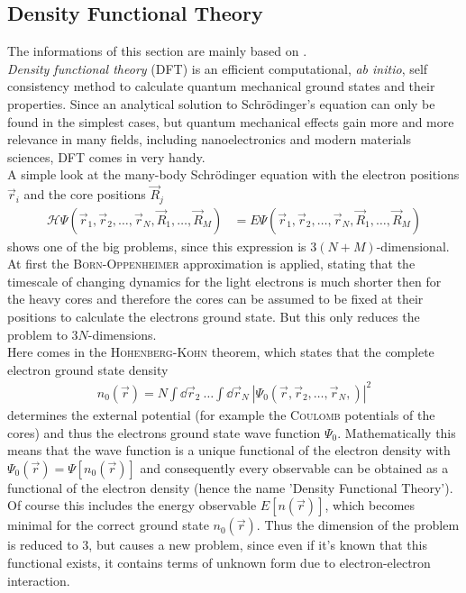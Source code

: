 \subsection{Density Functional Theory}
The informations of this section are mainly based on \cite{KOSKINEN2009237,1402-4896-2004-T109-001}.\\
\emph{Density functional theory} (DFT) is an efficient computational, \emph{ab initio}, self consistency method to calculate quantum mechanical ground states and their properties. Since an analytical solution to Schrödinger's equation can only be found in the simplest cases, but quantum mechanical effects gain more and more relevance in many fields, including nanoelectronics and modern materials sciences, DFT comes in very handy.\\
A simple look at the many-body Schrödinger equation with the electron positions $\vec{r}_i$ and the core positions $\vec{R}_j$
\begin{align}
	\mathcal{H} \Psi\left(\vec{r}_1,\vec{r}_2,\dots,\vec{r}_N,\vec{R}_1,\dots,\vec{R}_M\right) &= E \Psi\left(\vec{r}_1,\vec{r}_2,\dots,\vec{r}_N,\vec{R}_1,\dots,\vec{R}_M\right)
\end{align}
shows one of the big problems, since this expression is $3(N+M)$-dimensional.
At first the \textsc{Born-Oppenheimer} approximation is applied, stating that the timescale of changing dynamics for the light electrons is much shorter then for the heavy cores and therefore the cores can be assumed to be fixed at their positions to calculate the electrons ground state. But this only reduces the problem to $3N$-dimensions.\\
Here comes in the \textsc{Hohenberg-Kohn} theorem, which states that the complete electron ground state density
\begin{align}
n_0\left(\vec{r}\right) = N\int\dd\vec{r}_2\ \dots\int\dd\vec{r}_N\ \left|\Psi_0\left(\vec{r}, \vec{r}_2, \dots,\vec{r}_N,\right)\right|^2
\end{align}
determines the external potential (for example the \textsc{Coulomb} potentials of the cores) and thus the electrons ground state wave function $\Psi_0$. Mathematically this means that the wave function is a unique functional of the electron density with $\Psi_0\left(\vec{r}\right) = \Psi\left[n_0\left(\vec{r}\right)\right]$ and consequently every observable can be obtained as a functional of the electron density (hence the name 'Density Functional Theory').\\
Of course this includes the energy observable $E[n\left(\vec{r}\right)]$, which becomes minimal for the correct ground state $n_0\left(\vec{r}\right)$. Thus the dimension of the problem is reduced to $3$, but causes a new problem, since even if it's known that this functional exists, it contains terms of unknown form due to electron-electron interaction.\\
